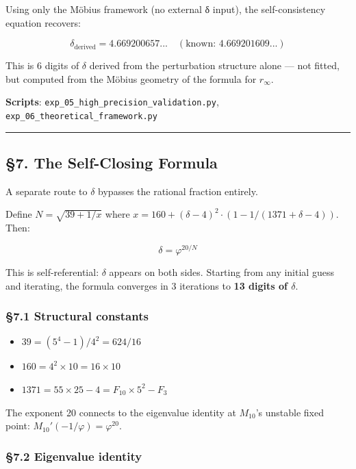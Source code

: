 \documentclass[
  11pt,
  a4paper]{article}
\providecommand{\tightlist}{%
  \setlength{\itemsep}{0pt}\setlength{\parskip}{0pt}}
\begin{document}
Using only the Möbius framework (no external δ input), the
self-consistency equation recovers:

\[\delta_\text{derived} = 4.669200657... \quad (\text{known: } 4.669201609...)\]

This is 6 digits of \(\delta\) derived from the perturbation structure
alone --- not fitted, but computed from the Möbius geometry of the
formula for \(r_\infty\).

\textbf{Scripts}: \texttt{exp\_05\_high\_precision\_validation.py},
\texttt{exp\_06\_theoretical\_framework.py}

\begin{center}\rule{0.5\linewidth}{0.5pt}\end{center}

\subsection{§7. The Self-Closing
Formula}\label{the-self-closing-formula}

A separate route to \(\delta\) bypasses the rational fraction entirely.

Define \(N = \sqrt{39 + 1/x}\) where
\(x = 160 + (\delta - 4)^2 \cdot (1 - 1/(1371 + \delta - 4))\). Then:

\[\delta = \varphi^{20/N}\]

This is self-referential: \(\delta\) appears on both sides. Starting
from any initial guess and iterating, the formula converges in 3
iterations to \textbf{13 digits of \(\delta\)}.

\subsubsection{§7.1 Structural constants}\label{structural-constants-1}

\begin{itemize}
\tightlist
\item
  \(39 = (5^4 - 1)/4^2 = 624/16\)
\item
  \(160 = 4^2 \times 10 = 16 \times 10\)
\item
  \(1371 = 55 \times 25 - 4 = F_{10} \times 5^2 - F_3\)
\end{itemize}

The exponent 20 connects to the eigenvalue identity at \(M_{10}\)'s
unstable fixed point: \(M_{10}'(-1/\varphi) = \varphi^{20}\).

\subsubsection{§7.2 Eigenvalue identity}\label{eigenvalue-identity}
\end{document}

